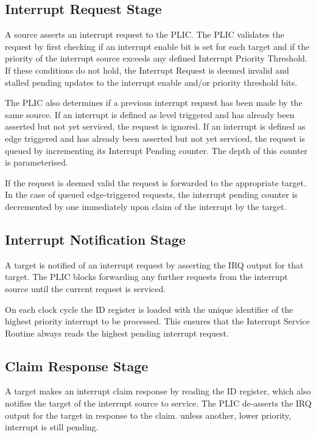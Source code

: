 \subsection{Interrupt Request Stage}

A source asserts an interrupt request to the PLIC. The PLIC validates
the request by first checking if an interrupt enable bit is set for each
target and if the priority of the interrupt source exceeds any defined
Interrupt Priority Threshold. If these conditions do not hold, the
Interrupt Request is deemed invalid and stalled pending updates to the interrupt enable and/or priority threshold bits.

The PLIC also determines if a previous interrupt request has been made by the same source.
If an interrupt is defined as level triggered and has already been asserted but not yet serviced, the request is ignored.
If an interrupt is defined as edge triggered and has already been asserted but not yet serviced, the request is queued by incrementing its Interrupt Pending counter.
The depth of this counter is parameterised.

If the request is deemed valid the request is forwarded to the
appropriate target. In the case of queued edge-triggered requests, the
interrupt pending counter is decremented by one immediately upon claim of the interrupt by the target.

\subsection{Interrupt Notification Stage}

A target is notified of an interrupt request by asserting the IRQ output for that target.
The PLIC blocks forwarding any further requests from the interrupt source until the current request is serviced.

On each clock cycle the ID register is loaded with the unique identifier of the highest priority interrupt to be processed.
This ensures that the Interrupt Service Routine always reads the highest pending interrupt request.

\subsection{Claim Response Stage} \label{sec:claim-response}

A target makes an interrupt claim response by reading the ID register,
which also notifies the target of the interrupt source to service. The
PLIC de-asserts the IRQ output for the target in response to the claim.
unless another, lower priority, interrupt is still pending.

